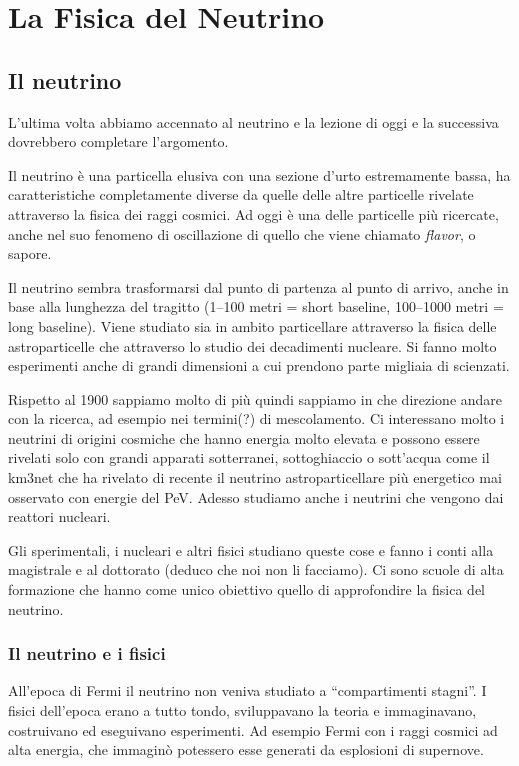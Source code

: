 \newcommand{\Qv}{$Q$-valore}

\chapter{La Fisica del Neutrino}
\section{Il neutrino}
    L'ultima volta abbiamo accennato al neutrino e la lezione di oggi e la successiva dovrebbero completare l'argomento.

    Il neutrino è una particella elusiva con una sezione d'urto estremamente bassa, ha caratteristiche completamente diverse da quelle delle altre particelle rivelate attraverso la fisica dei raggi cosmici. Ad oggi è una delle particelle più ricercate, anche nel suo fenomeno di oscillazione di quello che viene chiamato \emph{flavor}, o sapore.

    Il neutrino sembra trasformarsi dal punto di partenza al punto di arrivo, anche in base alla lunghezza del tragitto (1--100 metri = short baseline, 100--1000 metri = long baseline). Viene studiato sia in ambito particellare attraverso la fisica delle astroparticelle che attraverso lo studio dei decadimenti nucleare. Si fanno molto esperimenti anche di grandi dimensioni a cui prendono parte migliaia di scienzati.

    Rispetto al 1900 sappiamo molto di più quindi sappiamo in che direzione andare con la ricerca, ad esempio nei termini(?) di mescolamento. Ci interessano molto i neutrini di origini cosmiche che hanno energia molto elevata e possono essere rivelati solo con grandi apparati sotterranei, sottoghiaccio o sott'acqua come il km3net che ha rivelato di recente il neutrino astroparticellare più energetico mai osservato con energie del PeV. Adesso studiamo anche i neutrini che vengono dai reattori nucleari.
    
    Gli sperimentali, i nucleari e altri fisici studiano queste cose e fanno i conti alla magistrale e al dottorato (deduco che noi non li facciamo). Ci sono scuole di alta formazione che hanno come unico obiettivo quello di approfondire la fisica del neutrino.

    \subsection{Il neutrino e i fisici}
        All'epoca di Fermi il neutrino non veniva studiato a ``compartimenti stagni''. I fisici dell'epoca erano a tutto tondo, sviluppavano la teoria e immaginavano, costruivano ed eseguivano esperimenti. Ad esempio Fermi con i raggi cosmici ad alta energia, che immaginò potessero esse generati da esplosioni di supernove.

